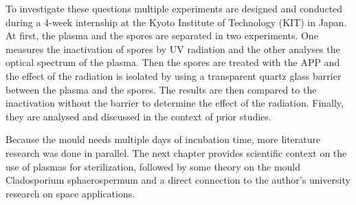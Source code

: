 To investigate these questions multiple experiments are designed and conducted during a 4-week internship at the Kyoto Institute of Technology (KIT) in Japan. At first, the plasma and the spores are separated in two experiments. One measures the inactivation of spores by UV radiation and the other analyses the optical spectrum of the plasma. Then the spores are treated with the APP and the effect of the radiation is isolated by using a transparent quartz glass barrier between the plasma and the spores. The results are then compared to the inactivation without the barrier to determine the effect of the radiation. Finally, they are analysed and discussed in the context of prior studies.

Because the mould needs multiple days of incubation time, more literature research was done in parallel. The next chapter provides scientific context on the use of plasmas for sterilization, followed by some theory on the mould Cladosporium sphaerospermum and a direct connection to the author's university research on space applications.